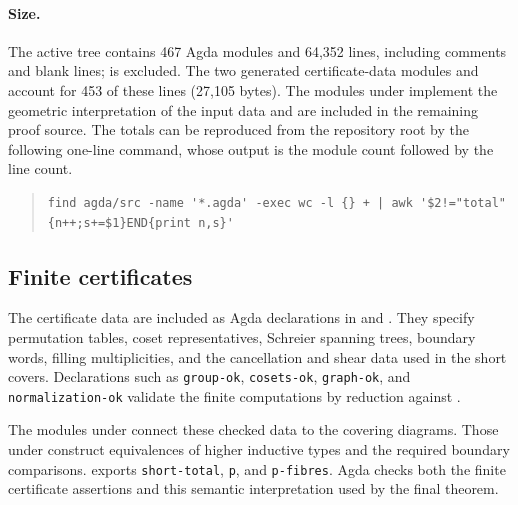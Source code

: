 \paragraph{Size.}
The active tree  contains 467 Agda modules and 64,352 lines,
including comments and blank lines;  is excluded.
The two generated certificate-data modules
 and  account for 453 of
these lines (27,105 bytes). The modules under  implement
the geometric interpretation of the input data and are included in the
remaining proof source. The totals can be reproduced from the repository
root by the following one-line command, whose output is the module count
followed by the line count.
\begin{quote}\scriptsize
\begin{verbatim}
find agda/src -name '*.agda' -exec wc -l {} + | awk '$2!="total"{n++;s+=$1}END{print n,s}'
\end{verbatim}
\end{quote}

\subsection{Finite certificates}
The certificate data are included as Agda declarations in
 and
. They specify permutation tables,
coset representatives, Schreier spanning trees, boundary words, filling
multiplicities, and the cancellation and shear data used in the short covers.
Declarations such as \texttt{group-ok}, \texttt{cosets-ok},
\texttt{graph-ok}, and \texttt{normalization-ok} validate the finite
computations by reduction against .

The modules under  connect these checked data to the
covering diagrams. Those under  construct equivalences
of higher inductive types and the required boundary comparisons.
 exports \texttt{short-total}, \texttt{p},
and \texttt{p-fibres}. Agda checks both the finite certificate assertions
and this semantic interpretation used by the final theorem.
